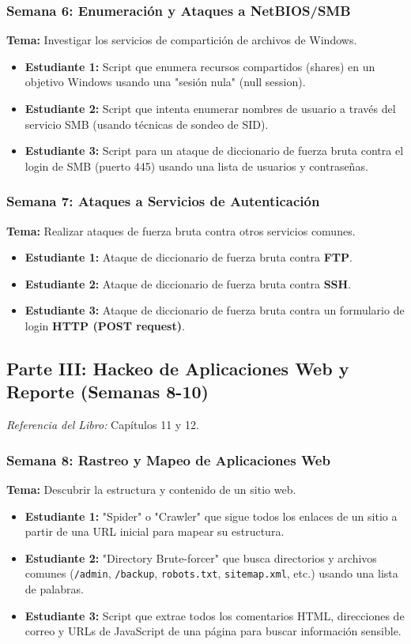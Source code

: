 \documentclass{article}
\begin{document}
\subsubsection*{Semana 6: Enumeración y Ataques a NetBIOS/SMB}
\textbf{Tema:} Investigar los servicios de compartición de archivos de Windows.
\begin{itemize}
    \item \textbf{Estudiante 1:} Script que enumera recursos compartidos (shares) en un objetivo Windows usando una "sesión nula" (null session).
    \item \textbf{Estudiante 2:} Script que intenta enumerar nombres de usuario a través del servicio SMB (usando técnicas de sondeo de SID).
    \item \textbf{Estudiante 3:} Script para un ataque de diccionario de fuerza bruta contra el login de SMB (puerto 445) usando una lista de usuarios y contraseñas.
\end{itemize}

\subsubsection*{Semana 7: Ataques a Servicios de Autenticación}
\textbf{Tema:} Realizar ataques de fuerza bruta contra otros servicios comunes.
\begin{itemize}
    \item \textbf{Estudiante 1:} Ataque de diccionario de fuerza bruta contra \textbf{FTP}.
    \item \textbf{Estudiante 2:} Ataque de diccionario de fuerza bruta contra \textbf{SSH}.
    \item \textbf{Estudiante 3:} Ataque de diccionario de fuerza bruta contra un formulario de login \textbf{HTTP (POST request)}.
\end{itemize}

\subsection*{Parte III: Hackeo de Aplicaciones Web y Reporte (Semanas 8-10)}
\textit{Referencia del Libro:} Capítulos 11 y 12.

\subsubsection*{Semana 8: Rastreo y Mapeo de Aplicaciones Web}
\textbf{Tema:} Descubrir la estructura y contenido de un sitio web.
\begin{itemize}
    \item \textbf{Estudiante 1:} "Spider" o "Crawler" que sigue todos los enlaces de un sitio a partir de una URL inicial para mapear su estructura.
    \item \textbf{Estudiante 2:} "Directory Brute-forcer" que busca directorios y archivos comunes (\texttt{/admin}, \texttt{/backup}, \texttt{robots.txt}, \texttt{sitemap.xml}, etc.) usando una lista de palabras.
    \item \textbf{Estudiante 3:} Script que extrae todos los comentarios HTML, direcciones de correo y URLs de JavaScript de una página para buscar información sensible.
\end{itemize}
\end{document}
